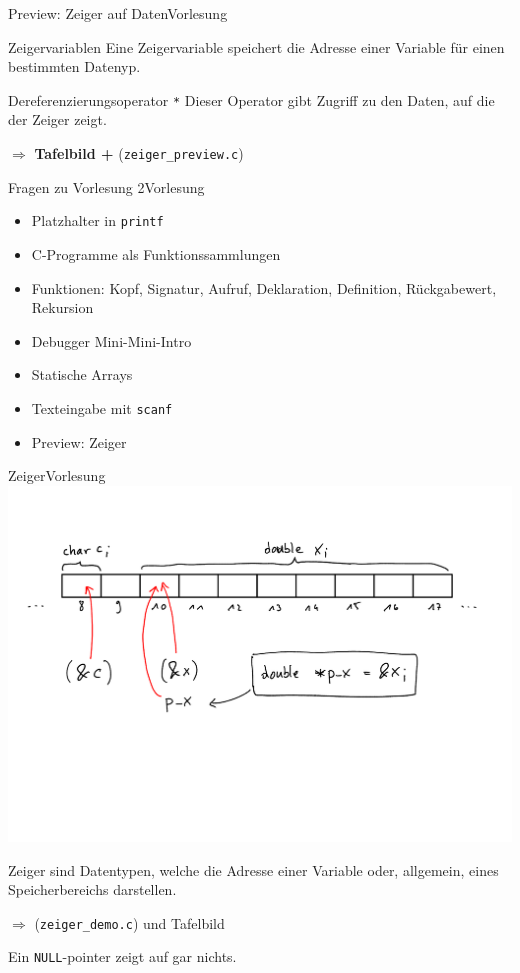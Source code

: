 \documentclass[xcolor=dvipsnames]{beamer}
\newcounter{lecturecounter}
\begin{document}
\begin{frame}[fragile]{Preview: Zeiger auf Daten}{Vorlesung }
\begin{block}{Zeigervariablen}
  Eine Zeigervariable speichert die Adresse einer Variable für einen bestimmten Datenyp.
\end{block}
\begin{block}{Dereferenzierungsoperator \texttt{*}}
  Dieser Operator gibt Zugriff zu den Daten, auf die der Zeiger zeigt.
\end{block}
$\Rightarrow$ \textbf{Tafelbild +} (\texttt{zeiger\_preview.c})
\end{frame}


\begin{frame}[fragile]{Fragen zu Vorlesung 2}{Vorlesung }
  \begin{itemize}
    \item{Platzhalter in \texttt{printf}}
    \item{C-Programme als Funktionssammlungen}
    \item{Funktionen: Kopf, Signatur, Aufruf, Deklaration, Definition, Rückgabewert, Rekursion}
    \item{Debugger Mini-Mini-Intro}
    \item{Statische Arrays}
    \item{Texteingabe mit \texttt{scanf}}
    \item{Preview: Zeiger}
  \end{itemize}
\end{frame}

\begin{frame}[fragile]{Zeiger}{Vorlesung }
  \includegraphics[width=\textwidth,page=1,trim=0 7cm 0 2cm,clip=true]{graphics/c_kurs_tafel}
  \begin{block}{}
    Zeiger sind Datentypen, welche die Adresse einer Variable oder, allgemein, eines Speicherbereichs darstellen.
  \end{block}
  $\Rightarrow$ (\texttt{zeiger\_demo.c}) und Tafelbild
  \begin{block}{}
    Ein \texttt{NULL}-pointer zeigt auf gar nichts.
  \end{block}
\end{frame}
\end{document}
